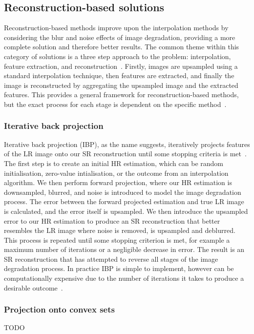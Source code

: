 \subsection{Reconstruction-based solutions}
Reconstruction-based methods improve upon the interpolation methods by considering the blur and noise effects of image degradation, providing a more complete solution and therefore better results. The common theme within this category of solutions is a three step approach to the problem: interpolation, feature extraction, and reconstruction~\cite{superResRemoteSensingOverview}. Firstly, images are upsampled using a standard interpolation technique, then features are extracted, and finally the image is reconstructed by aggregating the upsampled image and the extracted features. This provides a general framework for reconstruction-based methods, but the exact process for each stage is dependent on the specific method~\cite{superResRemoteSensingOverview}.

\subsubsection{Iterative back projection}
Iterative back projection (IBP), as the name suggests, iteratively projects features of the LR image onto our SR reconstruction until some stopping criteria is met~\cite{ref}. The first step is to create an initial HR estimation, which can be random initialisation, zero-value intialisation, or the outcome from an interpolation algorithm. We then perform forward projection, where our HR estimation is downsampled, blurred, and noise is introduced to model the image degradation process. The error between the forward projected estimation and true LR image is calculated, and the error itself is upsampled. We then introduce the upsampled error to our HR estimation to produce an SR reconstruction that better resembles the LR image where noise is removed, is upsampled and deblurred. This process is repeated until some stopping criterion is met, for example a maximum number of iterations or a negligible decrease in error. The result is an SR reconstruction that has attempted to reverse all stages of the image degradation process. In practice IBP is simple to implement, however can be computationally expensive due to the number of iterations it takes to produce a desirable outcome~\cite{ref}.

\subsubsection{Projection onto convex sets}
TODO

